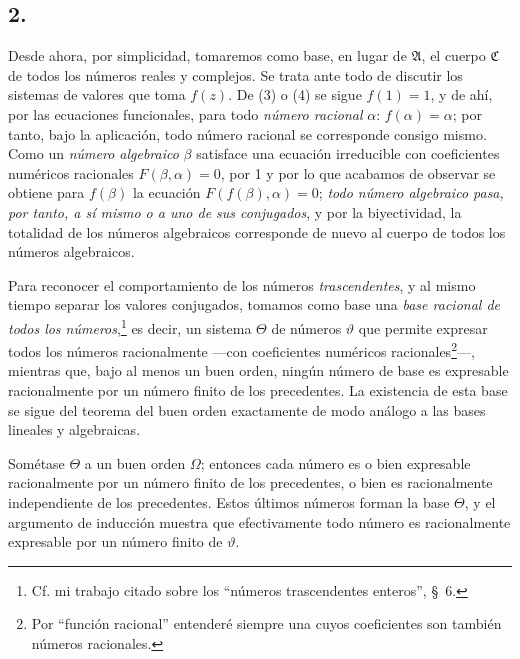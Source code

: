 \documentclass[11pt]{article}
\begin{document}
\subsection*{2.}

Desde ahora, por simplicidad, tomaremos como base, en lugar de $\mathfrak A$, el cuerpo $\mathfrak C$ de todos los números reales y complejos. Se trata ante todo de discutir los sistemas de valores que toma $f(z)$. De (3) o (4) se sigue $f(1)=1$, y de ahí, por las ecuaciones funcionales, para todo \emph{número racional} $\alpha$: $f(\alpha)=\alpha$; por tanto, bajo la aplicación, todo número racional se corresponde consigo mismo. Como un \emph{número algebraico} $\beta$ satisface una ecuación irreducible con coeficientes numéricos racionales $F(\beta,\alpha)=0$, por 1 y por lo que acabamos de observar se obtiene para $f(\beta)$ la ecuación $F(f(\beta),\alpha)=0$; \emph{todo número algebraico pasa, por tanto, a sí mismo o a uno de sus conjugados}, y por la biyectividad, la totalidad de los números algebraicos corresponde de nuevo al cuerpo de todos los números algebraicos.

Para reconocer el comportamiento de los números \emph{trascendentes}, y al mismo tiempo separar los valores conjugados, tomamos como base una \emph{base racional de todos los números},\footnote{Cf. mi trabajo citado sobre los ``números trascendentes enteros'', \S\ 6.} es decir, un sistema $\Theta$ de números $\vartheta$ que permite expresar todos los números racionalmente ---con coeficientes numéricos racionales\footnote{Por ``función racional'' entenderé siempre una cuyos coeficientes son también números racionales.}---, mientras que, bajo al menos un buen orden, ningún número de base es expresable racionalmente por un número finito de los precedentes. La existencia de esta base se sigue del teorema del buen orden exactamente de modo análogo a las bases lineales y algebraicas.

Sométase $\Theta$ a un buen orden $\Omega$; entonces cada número es o bien expresable racionalmente por un número finito de los precedentes, o bien es racionalmente independiente de los precedentes. Estos últimos números forman la base $\Theta$, y el argumento de inducción muestra que efectivamente todo número es racionalmente expresable por un número finito de $\vartheta$.
\end{document}
